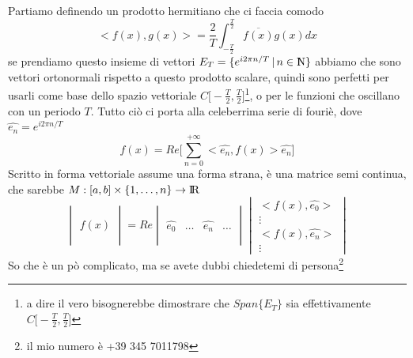 \documentclass[11pt,a4paper]{report}
\theoremstyle{definition}
\theoremstyle{plain}
\theoremstyle{plain}
\begin{document}
			Partiamo definendo un prodotto hermitiano che ci faccia comodo
			\begin{equation}
				<f(x),g(x)>=\frac{2}{T}\int_{-\frac{T}{2}}^\frac{T}{2} \overline{f(x)}g(x)dx
			\end{equation}
			se prendiamo questo insieme di vettori $E_T=\{e^{i2\pi n/ T} \, | \, n \in \rm I\!\! N\}$ abbiamo che sono vettori ortonormali rispetto a questo prodotto scalare, quindi sono perfetti per usarli come base dello spazio vettoriale $C\big[-\frac{T}{2},\frac{T}{2}\big]$\footnote{a dire il vero bisognerebbe dimostrare che $Span\{E_T\}$ sia effettivamente $C\big[-\frac{T}{2},\frac{T}{2}\big]$}, o per le funzioni che oscillano con un periodo $T$.\newline
			Tutto ciò ci porta alla celeberrima serie di fouriè, dove $\widehat{e_n}=e^{i2\pi n/ T}$
			\begin{equation}
			\label{serieFuriè}
				f(x)=Re\Bigg[\sum_{n=0}^{+\infty} <\widehat{e_n},f(x)>\widehat{e_n}\Bigg]
			\end{equation}
			Scritto in forma vettoriale assume una forma strana, è una matrice semi continua, che sarebbe $M:[a,b]\times \{1,\dots,n\}\rightarrow \rm I\!R$
			\begin{equation}
				\begin{vmatrix}
					\,\\
					\,\\
					f(x)\\
					\,\\
					\,
				\end{vmatrix}
				=Re
				\begin{vmatrix}
					\, & & &\\
					\, & & &\\
					\widehat{e_0}& \dots & \widehat{e_n}&\dots\\
					\, & & &\\
					\, & & &
				\end{vmatrix}
				\begin{vmatrix}
					<f(x),\widehat{e_0}>\\
					\vdots\\
					<f(x),\widehat{e_n}>\\
					\vdots
				\end{vmatrix}
			\end{equation}
			So che è un pò complicato, ma se avete dubbi chiedetemi di persona\footnote{il mio numero è +39 345 7011798}
\end{document}
